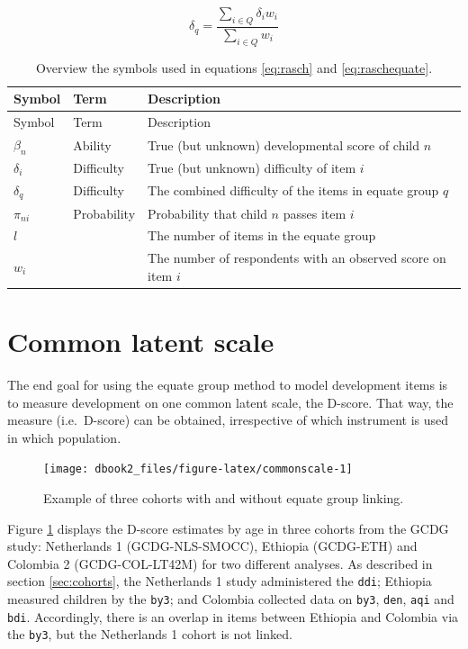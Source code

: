 \documentclass[
]{book}
\begin{document}
\begin{equation}
\delta_q = \frac{\sum_{i\in Q} \delta_iw_i}{\sum_{i\in Q} w_i} \label{eq:raschequate}
\end{equation}

\begin{longtable}[]{@{}lll@{}}
\caption{\label{tab:symbols} Overview the symbols used in equations \eqref{eq:rasch} and \eqref{eq:raschequate}.}\tabularnewline
\toprule
Symbol & Term & Description\tabularnewline
\midrule
\endfirsthead
\toprule
Symbol & Term & Description\tabularnewline
\midrule
\endhead
\(\beta_n\) & Ability & True (but unknown) developmental score of child \(n\)\tabularnewline
\(\delta_i\) & Difficulty & True (but unknown) difficulty of item \(i\)\tabularnewline
\(\delta_q\) & Difficulty & The combined difficulty of the items in equate group \(q\)\tabularnewline
\(\pi_{ni}\) & Probability & Probability that child \(n\) passes item \(i\)\tabularnewline
\(l\) & & The number of items in the equate group\tabularnewline
\(w_i\) & & The number of respondents with an observed score on item \(i\)\tabularnewline
\bottomrule
\end{longtable}

\hypertarget{sec:commonscale}{%
\section{Common latent scale}\label{sec:commonscale}}

The end goal for using the equate group method to model development items is to measure development on one common latent scale, the D-score. That way, the measure (i.e.~D-score) can be obtained, irrespective of which instrument is used in which population.

\begin{figure}

{\centering \texttt{[image: dbook2\_files/figure-latex/commonscale-1]} 

}

\caption{Example of three cohorts with and without equate group linking.}\label{fig:commonscale}
\end{figure}



Figure \ref{fig:commonscale} displays the D-score estimates by age in three cohorts from the GCDG study: Netherlands 1 (GCDG-NLS-SMOCC), Ethiopia (GCDG-ETH) and Colombia 2 (GCDG-COL-LT42M) for two different analyses. As described in section \ref{sec:cohorts}, the Netherlands 1 study administered the \texttt{ddi}; Ethiopia measured children by the \texttt{by3}; and Colombia collected data on \texttt{by3}, \texttt{den}, \texttt{aqi} and \texttt{bdi}. Accordingly, there is an overlap in items between Ethiopia and Colombia via the \texttt{by3}, but the Netherlands 1 cohort is not linked.
\end{document}

